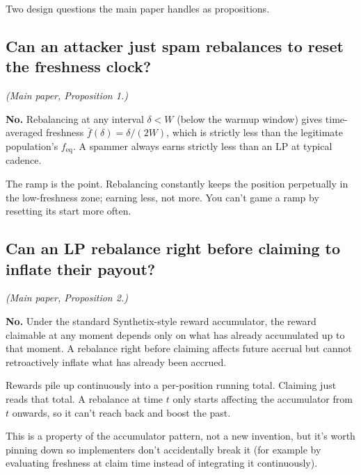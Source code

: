 \documentclass[11pt,a4paper]{article}
\begin{document}
Two design questions the main paper handles as propositions.

\subsection{Can an attacker just spam rebalances to reset the freshness clock?}

\emph{(Main paper, Proposition 1.)}

\begin{result}
\textbf{No.} Rebalancing at any interval $\delta < W$ (below the warmup window) gives time-averaged freshness $\bar f(\delta) = \delta/(2W)$, which is strictly less than the legitimate population's $f_{\text{eq}}$. A spammer always earns strictly less than an LP at typical cadence.
\end{result}

\begin{intuition}
The ramp is the point. Rebalancing constantly keeps the position perpetually in the low-freshness zone; earning less, not more. You can't game a ramp by resetting its start more often.
\end{intuition}

\subsection{Can an LP rebalance right before claiming to inflate their payout?}

\emph{(Main paper, Proposition 2.)}

\begin{result}
\textbf{No.} Under the standard Synthetix-style reward accumulator, the reward claimable at any moment depends only on what has already accumulated up to that moment. A rebalance right before claiming affects future accrual but cannot retroactively inflate what has already been accrued.
\end{result}

\begin{intuition}
Rewards pile up continuously into a per-position running total. Claiming just reads that total. A rebalance at time $t$ only starts affecting the accumulator from $t$ onwards, so it can't reach back and boost the past.

This is a property of the accumulator pattern, not a new invention, but it's worth pinning down so implementers don't accidentally break it (for example by evaluating freshness at claim time instead of integrating it continuously).
\end{intuition}
\end{document}
